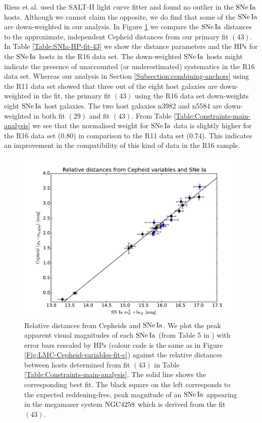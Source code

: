 Riess et al. \cite{Riess:2016jrr} used the SALT-II light curve fitter and found no outlier in the $\mathrm{SNe\,Ia}$ hosts. Although we cannot claim the opposite, we do find that some of the $\mathrm{SNe\,Ia}$ are down-weighted in our analysis. In Figure \ref{Fig:comparison-distances-R16} we compare the $\mathrm{SNe\,Ia}$ distances to the approximate, independent Cepheid distances from our primary fit $(43)$. In Table \ref{Table:SNIa-HP-fit-43} we show the distance parameters and the HPs for the $\mathrm{SNe\,Ia}$ hosts in the R16 data set. The down-weighted $\mathrm{SNe\,Ia}$ hosts might indicate the presence of unaccounted (or underestimated) systematics in the R16 data set. Whereas our analysis in Section \ref{Subsection:combining-anchors} using the R11 data set showed that three out of the eight host galaxies are down-weighted in the fit, the primary fit $(43)$ using the R16 data set down-weights eight $\mathrm{SNe\,Ia}$ host galaxies. The two host galaxies n3982 and n5584 are down-weighted in both fit $(29)$ and fit $(43)$. From Table \ref{Table:Constraints-main-analysis} we see that the normalised weight for $\mathrm{SNe\,Ia}$ data is slightly higher for the R16 data set ($0.80$) in comparison to the R11 data set ($0.74$). This indicates an improvement in the compatibility of this kind of data in the R16 sample.

\begin{figure}[hbtp]
\centering
\includegraphics[width=\textwidth]{figures/chapter-h0/effective_HP_SNIa_R16.pdf}
\caption{Relative distances from Cepheids and $\mathrm{SNe\,Ia}$. We plot the peak apparent visual magnitudes of each $\mathrm{SNe\,Ia}$ (from Table 5 in \cite{Riess:2016jrr}) with error bars rescaled by HPs (colour code is the same as in Figure \ref{Fig:LMC-Cepheid-variables-fit-c}) against the relative distances between hosts determined from fit $(43)$ in Table \ref{Table:Constraints-main-analysis}. The solid line shows the corresponding best fit. The black square on the left corresponds to the expected reddening-free, peak magnitude of an $\mathrm{SNe\,Ia}$ appearing in the megamaser system $\mathrm{NGC4258}$ which is derived from the fit $(43)$.}
\label{Fig:comparison-distances-R16}
\end{figure}

